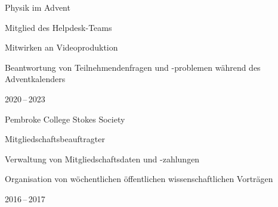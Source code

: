 



\begin{cvhonors}
  \cvhonor
    {Physik im Advent} %
    {%
      Mitglied des Helpdesk-Teams\newline~
      \begin{cvitems}
        \item {Mitwirken an Videoproduktion}
        \item {Beantwortung von Teilnehmendenfragen und -problemen w\"ahrend des Adventkalenders}
      \end{cvitems}
    } %
    {} %
    {2020\,--\,2023} %

  \cvhonor
    {Pembroke College Stokes Society} %
    {%
      Mitgliedschaftsbeauftragter\newline~
      \begin{cvitems}
        \item {Verwaltung von Mitgliedschaftsdaten und -zahlungen}
        \item {Organisation von w\"ochentlichen \"offentlichen wissenschaftlichen Vortr\"agen}
      \end{cvitems}
    } %
    {} %
    {2016\,--\,2017} %

\end{cvhonors}



